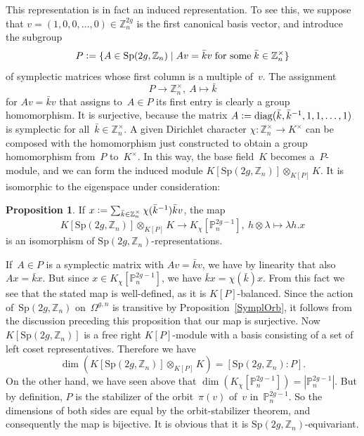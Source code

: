 \documentclass[12pt]{article}
\makeatletter
\theoremstyle{definition}
\newtheorem{Proposition}[Satz]{Proposition}
\theoremstyle{break}
\renewenvironment{proof}[1][\proofname]{\par
\vspace{-5pt}%
\pushQED{\qed}%
\normalfont
\topsep0pt \partopsep0pt %
\trivlist
\item[\hskip\labelsep
\bfseries
#1\@addpunct{.}]\ignorespaces
}{%
\popQED\endtrivlist\@endpefalse
\addvspace{6pt plus 6pt} %
}
\newcommand{\Z}{\mathbb{Z}}
\DeclareMathOperator\diag{diag}
\newcommand{\Sp}{\mathrm{Sp}}
\renewcommand{\P}{\mathbb{P}}
\renewcommand{\1}{\mathbbm{1}}
\renewcommand{\P}{\mathbb{P}}
\newcommand{\ot}{\mathbin{\otimes}}
\newcommand{\deq}{\vcentcolon =}
\makeatother
\begin{document}
This representation is in fact an induced representation. To see this, we suppose that
$v = (1,0,0,\dots,0) \in \Z_n^{2g}$ is the first canonical basis vector, and introduce the subgroup
\[P \deq \{A \in \Sp(2g,\Z_n) \mid
A v = \bar{k} v \; \text{for some} \; \bar{k} \in \Z_n^\times\}\]
of symplectic matrices whose first column is a multiple of~$v$. The assignment
\[P \to \Z_n^\times,~A \mapsto \bar{k}\]
for $A v = \bar{k} v$ that assigns to~$A \in P$ its first entry is clearly a group homomorphism. It is surjective, because the matrix
$A \deq \diag(\bar{k}, \bar{k}^{-1}, 1, 1, \ldots, 1)$ is symplectic for
all~$\bar{k} \in \Z_n^\times$. A given Dirichlet character $\chi \colon \Z_n^\times \to K^\times$ can be composed with the homomorphism just constructed to obtain a group homomorphism from~$P$ to~$K^\times$. In this way, the base field~$K$ becomes a~$P$-module, and we can form the induced module
$K[\Sp(2g,\Z_n)] \ot_{K[P]} K$. It is isomorphic to the eigenspace under consideration:
\begin{Proposition}
If $x \deq \sum_{\bar{k} \in \Z_n^\times} \chi(\bar{k}^{-1}) \bar{k} v$, the map
\[K[\Sp(2g,\Z_n)] \ot_{K[P]} K \to K_\chi[\P^{2g-1}_n],~h \ot \lambda \mapsto \lambda h.x\]
is an isomorphism of $\Sp(2g,\Z_n)$-representations.
\end{Proposition}
\begin{proof}
If~$A \in P$ is a symplectic matrix with $A v = \bar{k} v$, we have by linearity that also
$A x = \bar{k} x$. But since $x \in K_\chi[\P^{2g-1}_n]$, we have $\bar{k} x = \chi(\bar{k}) x$.
From this fact we see that the stated map is well-defined, as it is $K[P]$-balanced. Since the action of~$\Sp(2g,\Z_n)$ on~$\Omega^{g,n}$ is transitive by Proposition~\ref{SymplOrb}, it follows from the discussion preceding this proposition that our map is surjective. Now
$K[\Sp(2g,\Z_n)]$ is a free right \mbox{$K[P]$-module} with a basis consisting of a set of left coset representatives. Therefore we have
\[\dim(K[\Sp(2g,\Z_n)] \ot_{K[P]} K) = [\Sp(2g,\Z_n):P].\]
On the other hand, we have seen above that
$\dim(K_\chi[\P^{2g-1}_n]) = |\P^{2g-1}_n|$. But by definition, $P$ is the stabilizer of the orbit~$\pi(v)$ of~$v$ in~$\P^{2g-1}_n$. So the dimensions of both sides are equal by the orbit-stabilizer theorem, and consequently the map is bijective. It is obvious that it is
$\Sp(2g,\Z_n)$-equivariant.
\end{proof}
\end{document}
